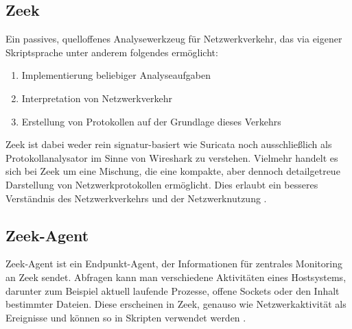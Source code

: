 \subsection{Zeek}
Ein passives, quelloffenes Analysewerkzeug für Netzwerkverkehr, das via eigener  Skriptsprache unter anderem folgendes ermöglicht:
\begin{enumerate}
\item{Implementierung beliebiger Analyseaufgaben}
\item{Interpretation von Netzwerkverkehr}
\item{Erstellung von Protokollen auf der Grundlage dieses Verkehrs}
\end{enumerate}
Zeek ist dabei weder rein signatur-basiert wie Suricata noch ausschließlich als Protokollanalysator im Sinne von Wireshark zu verstehen. Vielmehr handelt es sich bei Zeek um eine Mischung, die eine kompakte, aber dennoch detailgetreue Darstellung von Netzwerkprotokollen ermöglicht. Dies erlaubt ein besseres Verständnis des Netzwerkverkehrs und der Netzwerknutzung \cite{zeek_about_page}.

\subsection{Zeek-Agent}
Zeek-Agent ist ein Endpunkt-Agent, der Informationen für zentrales Monitoring an Zeek sendet.
Abfragen kann man verschiedene Aktivitäten eines Hostsystems, darunter zum Beispiel aktuell laufende Prozesse, offene Sockets oder den Inhalt bestimmter Dateien. Diese erscheinen in Zeek, genauso wie Netzwerkaktivität als Ereignisse und können so in Skripten verwendet werden \cite{zeek_agent}.

